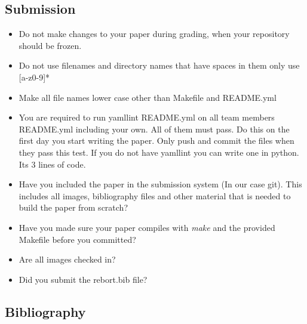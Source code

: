 \subsection{Submission}

\begin{itemize}[label=$\Box$]
    \item Do not make changes to your paper during grading, when your
      repository should be frozen.
     \item Do not use filenames and directory names that have spaces
       in them only use [a-z0-9]*
     \item Make all file names lower case other than Makefile and
       README.yml
     \item You are required to run yamllint README.yml on all team
       members README.yml including your own. All of them must pass. Do this
       on the first day you start writing the paper. Only push and
       commit the files when they pass this test. If you do not have
       yamllint you can write one in python. Its 3 lines of code.
     \item Have you included the paper in the submission system (In
       our case git). This includes all images, bibliography files and
       other material that is needed to build the paper from scratch?
     \item Have you made sure your paper compiles with {\em make} and
       the provided Makefile before you committed?
     \item Are all images checked in?
     \item Did you submit the rebort.bib file?
\end{itemize}

\subsection{Bibliography}

